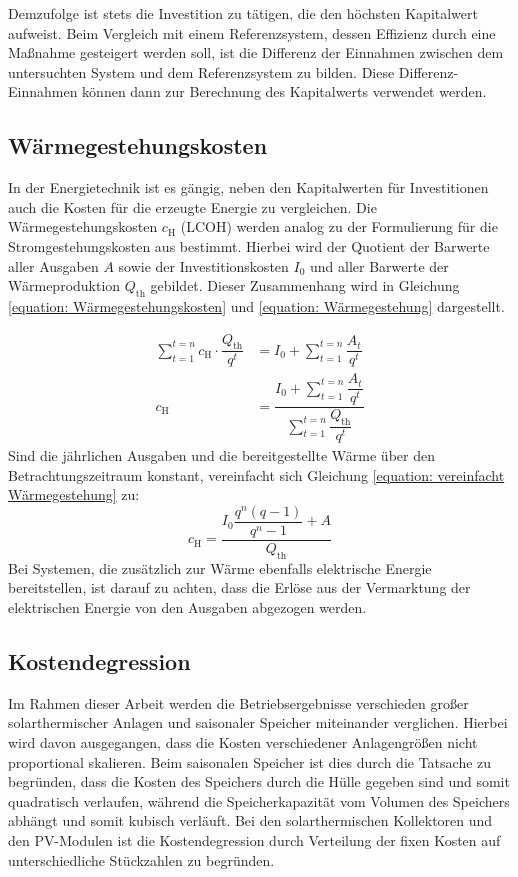 Demzufolge ist stets die Investition zu tätigen, die den höchsten Kapitalwert aufweist. Beim Vergleich mit einem Referenzsystem, dessen Effizienz durch eine Maßnahme gesteigert werden soll, ist die Differenz der Einnahmen zwischen dem untersuchten System und dem Referenzsystem zu bilden. Diese Differenz-Einnahmen können dann zur Berechnung des Kapitalwerts verwendet werden.

\subsection{Wärmegestehungskosten}
In der Energietechnik ist es gängig, neben den Kapitalwerten für Investitionen auch die Kosten für die erzeugte Energie zu vergleichen. Die Wärmegestehungskosten $c_\text{H}$ (\ac{LCOH}) werden analog zu der Formulierung für die Stromgestehungskosten aus \citet{Konstantin2013} bestimmt. Hierbei wird der Quotient der Barwerte aller Ausgaben $A$ sowie der Investitionskosten $I_0$ und aller Barwerte der Wärmeproduktion $Q_\text{th}$ gebildet. Dieser Zusammenhang wird in Gleichung \ref{equation: Wärmegestehungskosten} und \ref{equation: Wärmegestehung} dargestellt.

	\begin{align}\label{equation: Wärmegestehungskosten}
		\sum_{t=1}^{t=n} c_\text{H} \cdot \dfrac{Q_\text{th}}{q^t} &= I_0 + \sum_{t=1}^{t=n}\dfrac{A_t}{q^t} \\
		\label{equation: Wärmegestehung}
		 c_\text{H} &= \dfrac{I_0 + \sum_{t=1}^{t=n}\dfrac{A_t}{q^t}}{\sum_{t=1}^{t=n} \dfrac{Q_\text{th}}{q^t}}
	\end{align}   
Sind die jährlichen Ausgaben und die bereitgestellte Wärme über den Betrachtungszeitraum konstant, vereinfacht sich Gleichung \ref{equation: vereinfacht Wärmegestehung} zu:
	\begin{equation}
		\label{equation: vereinfacht Wärmegestehung}
		c_\text{H} = \dfrac{I_0 \dfrac{q^n (q - 1)}{q^n - 1} + A}{Q_\text{th}}
	\end{equation}
Bei Systemen, die zusätzlich zur Wärme ebenfalls elektrische Energie bereitstellen, ist darauf zu achten, dass die Erlöse aus der Vermarktung der elektrischen Energie von den Ausgaben abgezogen werden.
	

\subsection{Kostendegression}\label{subsection: Kostendegression}
Im Rahmen dieser Arbeit werden die Betriebsergebnisse verschieden großer solarthermischer Anlagen und saisonaler Speicher miteinander verglichen. Hierbei wird davon ausgegangen, dass die Kosten verschiedener Anlagengrößen nicht proportional skalieren. Beim saisonalen Speicher ist dies durch die Tatsache zu begründen, dass die Kosten des Speichers durch die Hülle gegeben sind und somit quadratisch verlaufen, während die Speicherkapazität vom Volumen des Speichers abhängt und somit kubisch verläuft. Bei den solarthermischen Kollektoren und den \ac{PV}-Modulen ist die Kostendegression durch Verteilung der fixen Kosten auf unterschiedliche Stückzahlen zu begründen. 

